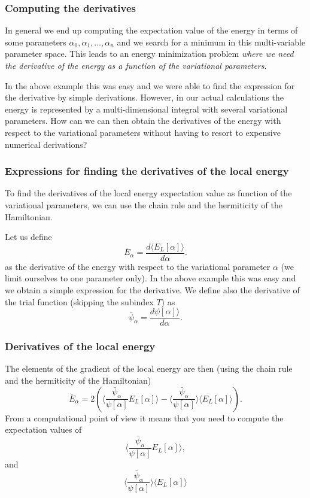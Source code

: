 \documentclass{beamer}
\begin{document}
\begin{frame}
\frametitle{Computing the derivatives}

\begin{block}{}

In general we end up computing the expectation value of the energy in terms 
of some parameters $\alpha_0,\alpha_1,\dots,\alpha_n$
and we search for a minimum in this multi-variable parameter space.  
This leads to an energy minimization problem \emph{where we need the derivative of the energy as a function of the variational parameters}.

In the above example this was easy and we were able to find the expression for the derivative by simple derivations. 
However, in our actual calculations the energy is represented by a multi-dimensional integral with several variational parameters.
How can we can then obtain the derivatives of the energy with respect to the variational parameters without having 
to resort to expensive numerical derivations? 

\end{block}
\end{frame}

\begin{frame}
\frametitle{Expressions for finding the derivatives of the local energy}

\begin{block}{}

To find the derivatives of the local energy expectation value as function of the variational parameters, we can use the chain rule and the hermiticity of the Hamiltonian.  

Let us define 
\[
\bar{E}_{\alpha}=\frac{d\langle  E_L[\alpha]\rangle}{d\alpha}.
\]
as the derivative of the energy with respect to the variational parameter $\alpha$ (we limit ourselves to one parameter only).
In the above example this was easy and we obtain a simple expression for the derivative.
We define also the derivative of the trial function (skipping the subindex $T$) as 
\[
\bar{\psi}_{\alpha}=\frac{d\psi[\alpha]\rangle}{d\alpha}.
\]
\end{block}
\end{frame}

\begin{frame}
\frametitle{Derivatives of the local energy}

\begin{block}{}
The elements of the gradient of the local energy are then (using the chain rule and the hermiticity of the Hamiltonian)
\[
\bar{E}_{\alpha} = 2\left( \langle \frac{\bar{\psi}_{\alpha}}{\psi[\alpha]}E_L[\alpha]\rangle -\langle \frac{\bar{\psi}_{\alpha}}{\psi[\alpha]}\rangle\langle E_L[\alpha] \rangle\right).
\]
From a computational point of view it means that you need to compute the expectation values of 
\[
\langle \frac{\bar{\psi}_{\alpha}}{\psi[\alpha]}E_L[\alpha]\rangle,
\]
and
\[
\langle \frac{\bar{\psi}_{\alpha}}{\psi[\alpha]}\rangle\langle E_L[\alpha]\rangle
\]
\end{block}
\end{frame}
\end{document}
